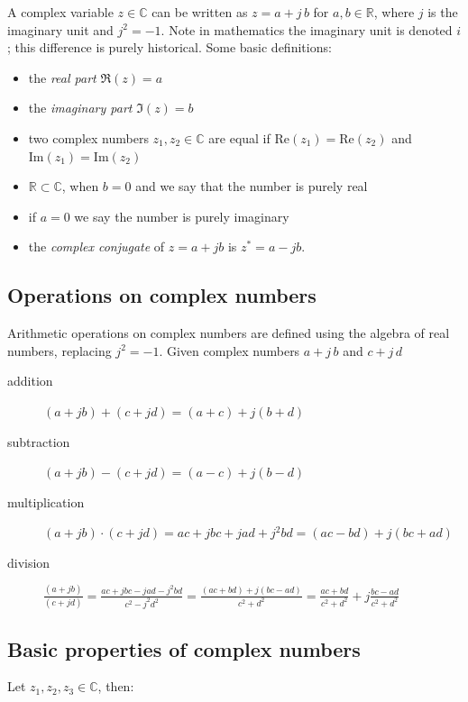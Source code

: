 A complex variable $z\in\mathbb{C}$ can be written as $z = a + j\, b$ for $a,b\in\mathbb{R}$, where $j$ is the imaginary unit and $j^2 = -1$. Note in mathematics the imaginary unit is denoted $i$; this difference is purely historical. Some basic definitions:

\begin{itemize}
\item the \emph{real part} $\Re(z) = a$
\item the \emph{imaginary part} $\Im(z) = b$
\item two complex numbers $z_1, z_2\in \mathbb{C}$ are equal if $\text{Re}(z_1) = \text{Re}(z_2)$ and $\text{Im}(z_1) = \text{Im}(z_2)$
\item $\mathbb{R} \subset \mathbb{C}$, when $b = 0$ and we say that the number is purely real
\item if $a = 0$ we say the number is purely imaginary
\item the \emph{complex conjugate} of $z = a + jb$ is $z^* = a - jb$.
\end{itemize}

\subsection*{Operations on complex numbers}

Arithmetic operations on complex numbers are defined using the algebra of real numbers, replacing $j^2 = -1$. Given complex numbers $a + j\, b$ and $c + j\, d$

\begin{description}
\item[addition] $(a + jb) + (c +jd) = (a+c) + j(b+d)$
\item[subtraction] $(a + jb) - (c +jd) = (a-c) + j(b-d)$
\item[multiplication] $(a + jb)\cdot(c +jd) = ac + jbc + jad + j^2 bd = (ac-bd) + j(bc+ad)$
\item[division] $\frac{(a + jb)}{(c +jd)} = \frac{ac+jbc-jad-j^2 bd}{c^2 -j^2 d^2} = \frac{(ac+bd) + j(bc-ad)}{c^2 + d^2} = \frac{ac+bd}{c^2 + d^2} + j \frac{bc-ad}{c^2 + d^2}$
\end{description}


\subsection*{Basic properties of complex numbers}

Let $z_1, z_2, z_3 \in \mathbb{C}$, then:

